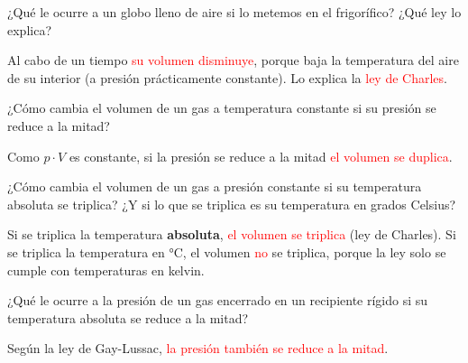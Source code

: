 \begin{exercise}
    ¿Qué le ocurre a un globo lleno de aire si lo metemos en el frigorífico? ¿Qué ley lo explica?
    \begin{solu}
        Al cabo de un tiempo \textcolor{red}{su volumen disminuye}, porque baja la temperatura del aire de su interior (a presión prácticamente constante). Lo explica la \textcolor{red}{ley de Charles}.
    \end{solu}
\end{exercise}

\begin{exercise}
    ¿Cómo cambia el volumen de un gas a temperatura constante si su presión se reduce a la mitad?
    \begin{solu}
        Como \(p \cdot V\) es constante, si la presión se reduce a la mitad \textcolor{red}{el volumen se duplica}.
    \end{solu}
\end{exercise}

\begin{exercise}
    ¿Cómo cambia el volumen de un gas a presión constante si su temperatura absoluta se triplica? ¿Y si lo que se triplica es su temperatura en grados Celsius?
    \begin{solu}
        Si se triplica la temperatura \textbf{absoluta}, \textcolor{red}{el volumen se triplica} (ley de Charles). Si se triplica la temperatura en \unit{\celsius}, el volumen \textcolor{red}{no} se triplica, porque la ley solo se cumple con temperaturas en kelvin.
    \end{solu}
\end{exercise}

\begin{exercise}
    ¿Qué le ocurre a la presión de un gas encerrado en un recipiente rígido si su temperatura absoluta se reduce a la mitad?
    \begin{solu}
        Según la ley de Gay-Lussac, \textcolor{red}{la presión también se reduce a la mitad}.
    \end{solu}
\end{exercise}

